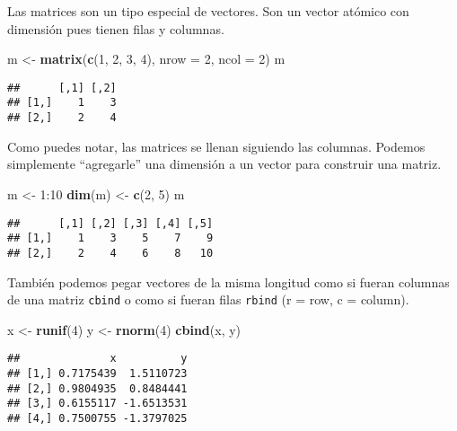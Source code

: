 \documentclass[]{article}
\newenvironment{Shaded}{\begin{snugshade}}{\end{snugshade}}
\newcommand{\KeywordTok}[1]{\textcolor[rgb]{0.13,0.29,0.53}{\textbf{{#1}}}}
\newcommand{\DataTypeTok}[1]{\textcolor[rgb]{0.13,0.29,0.53}{{#1}}}
\newcommand{\DecValTok}[1]{\textcolor[rgb]{0.00,0.00,0.81}{{#1}}}
\newcommand{\StringTok}[1]{\textcolor[rgb]{0.31,0.60,0.02}{{#1}}}
\newcommand{\NormalTok}[1]{{#1}}
\begin{document}
Las matrices son un tipo especial de vectores. Son un vector atómico con
dimensión pues tienen filas y columnas.

\begin{Shaded}
\begin{Highlighting}[]
\NormalTok{m <-}\StringTok{ }\KeywordTok{matrix}\NormalTok{(}\KeywordTok{c}\NormalTok{(}\DecValTok{1}\NormalTok{, }\DecValTok{2}\NormalTok{, }\DecValTok{3}\NormalTok{, }\DecValTok{4}\NormalTok{), }\DataTypeTok{nrow =} \DecValTok{2}\NormalTok{, }\DataTypeTok{ncol =} \DecValTok{2}\NormalTok{)}
\NormalTok{m}
\end{Highlighting}
\end{Shaded}

\begin{verbatim}
##      [,1] [,2]
## [1,]    1    3
## [2,]    2    4
\end{verbatim}

Como puedes notar, las matrices se llenan siguiendo las columnas.
Podemos simplemente ``agregarle'' una dimensión a un vector para
construir una matriz.

\begin{Shaded}
\begin{Highlighting}[]
\NormalTok{m <-}\StringTok{ }\DecValTok{1}\NormalTok{:}\DecValTok{10}
\KeywordTok{dim}\NormalTok{(m) <-}\StringTok{ }\KeywordTok{c}\NormalTok{(}\DecValTok{2}\NormalTok{, }\DecValTok{5}\NormalTok{)}
\NormalTok{m}
\end{Highlighting}
\end{Shaded}

\begin{verbatim}
##      [,1] [,2] [,3] [,4] [,5]
## [1,]    1    3    5    7    9
## [2,]    2    4    6    8   10
\end{verbatim}

También podemos pegar vectores de la misma longitud como si fueran
columnas de una matriz \texttt{cbind} o como si fueran filas
\texttt{rbind} (r = row, c = column).

\begin{Shaded}
\begin{Highlighting}[]
\NormalTok{x <-}\StringTok{ }\KeywordTok{runif}\NormalTok{(}\DecValTok{4}\NormalTok{)}
\NormalTok{y <-}\StringTok{ }\KeywordTok{rnorm}\NormalTok{(}\DecValTok{4}\NormalTok{)}
\KeywordTok{cbind}\NormalTok{(x, y)}
\end{Highlighting}
\end{Shaded}

\begin{verbatim}
##              x          y
## [1,] 0.7175439  1.5110723
## [2,] 0.9804935  0.8484441
## [3,] 0.6155117 -1.6513531
## [4,] 0.7500755 -1.3797025
\end{verbatim}
\end{document}

